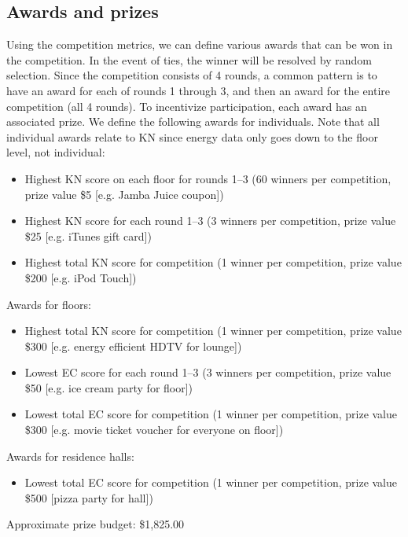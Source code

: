 \subsection{Awards and prizes}

Using the competition metrics, we can define various awards that can be won in the competition. In the event of ties, the winner will be resolved by random selection. Since the competition consists of 4 rounds, a common pattern is to have an award for each of rounds 1 through 3, and then an award for the entire competition (all 4 rounds). To incentivize participation, each award has an associated prize. We define the following awards for individuals. Note that all individual awards relate to KN since energy data only goes down to the floor level, not individual:

\begin{itemize}
	\item Highest KN score on each floor for rounds 1--3 (60 winners per competition, prize value \$5 [e.g. Jamba Juice coupon])
	\item Highest KN score for each round 1--3 (3 winners per competition, prize value \$25 [e.g. iTunes gift card])
	\item Highest total KN score for competition (1 winner per competition, prize value \$200 [e.g. iPod Touch])
\end{itemize}

Awards for floors:

\begin{itemize}
	\item Highest total KN score for competition (1 winner per competition, prize value \$300 [e.g. energy efficient HDTV for lounge])
	\item Lowest EC score for each round 1--3 (3 winners per competition, prize value \$50 [e.g. ice cream party for floor])
	\item Lowest total EC score for competition (1 winner per competition, prize value \$300 [e.g. movie ticket voucher for everyone on floor])
\end{itemize}

Awards for residence halls:

\begin{itemize}
	\item Lowest total EC score for competition (1 winner per competition, prize value \$500 [pizza party for hall])
\end{itemize}

Approximate prize budget: \$1,825.00

